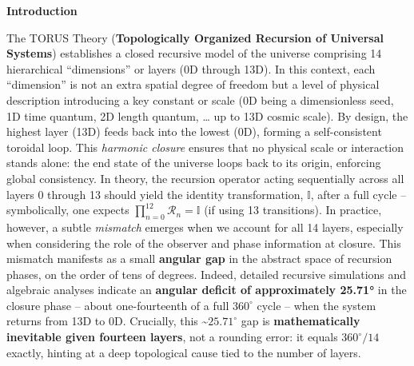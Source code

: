 \documentclass[]{article}
\begin{document}
\textbf{Introduction}

The TORUS Theory (\textbf{Topologically Organized Recursion of Universal
Systems}) establishes a closed recursive model of the universe
comprising 14 hierarchical ``dimensions'' or layers (0D through
13D)​. In this context, each ``dimension'' is
not an extra spatial degree of freedom but a level of physical
description introducing a key constant or scale (0D being a
dimensionless seed, 1D time quantum, 2D length quantum, \ldots{} up to
13D cosmic scale)​. By design, the highest layer (13D) feeds back into
the lowest (0D), forming a self-consistent toroidal loop​. This
\emph{harmonic closure} ensures that no physical scale or interaction
stands alone: the end state of the universe loops back to its origin,
enforcing global consistency. In theory, the recursion operator acting
sequentially across all layers 0 through 13 should yield the identity
transformation, $\mathbb{I}$, after a full cycle --
symbolically, one expects
$\prod_{n=0}^{12} \mathcal{R}_n = \mathbb{I}$ (if using 13 transitions). In
practice, however, a subtle \emph{mismatch} emerges when we account for
all 14 layers, especially when considering the role of the observer and
phase information at closure. This mismatch manifests as a small
\textbf{angular gap} in the abstract space of recursion phases, on the
order of tens of degrees. Indeed, detailed recursive simulations and
algebraic analyses indicate an \textbf{angular deficit of approximately
25.71°} in the closure phase -- about one-fourteenth of a full
$360^\circ$ cycle -- when the system returns from
13D to 0D. Crucially, this
\textasciitilde{}$25.71^\circ$ gap is
\textbf{mathematically inevitable given fourteen layers}, not a rounding
error: it equals $360^\circ/14$ exactly, hinting at
a deep topological cause tied to the number of layers.
\end{document}
